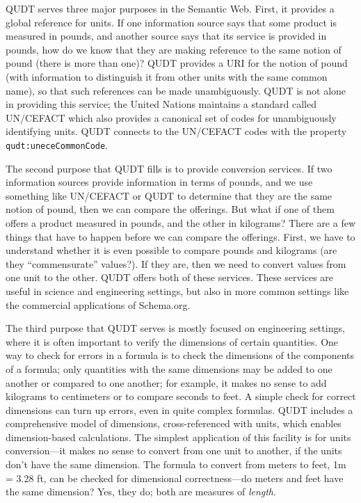 QUDT serves three major purposes in the Semantic Web. First, it provides
a global reference for units. If one information source says that some
product is measured in pounds, and another source
says that its service is provided in pounds, how do we know that they
are making reference to the same notion of pound (there is more than
one)? QUDT provides a URI for the notion of pound (with information to
distinguish it from other units with the same common name), so that such
references can be made unambiguously. QUDT is not alone in providing
this service; the United Nations maintains a standard called UN/CEFACT
which also  provides a canonical set of codes for unambiguously identifying
units. QUDT connects to the UN/CEFACT codes with the property
\texttt{qudt:uneceCommonCode}.

The second purpose that QUDT fills is to provide conversion services.
If two information sources
provide information in terms of pounds, and we use something like
UN/CEFACT or QUDT to determine that they are the same notion of pound,
then we can compare the offerings. But what if one of them offers a
product measured in pounds, and the other in kilograms? There are a few
things that have to happen before we can compare the offerings. First,
we have to understand whether it is even possible to compare pounds and
kilograms (are they ``commensurate'' values?). If they are, then we need
to convert values from one unit to the other. QUDT offers both of these
services. These services are useful in science and engineering settings,
but also in more common settings like the commercial applications of
Schema.org. 

The third purpose that QUDT serves is mostly focused on engineering
settings, where it is often important to verify the dimensions of
certain quantities. One way to check for errors in a formula is to check
the dimensions of the components of a formula; only quantities with the
same dimensions may be added to one another or compared to one another;
for example, it makes no sense to add kilograms to centimeters or to
compare seconds to feet. A simple check for correct dimensions can turn
up errors, even in quite complex formulas. QUDT includes a comprehensive
model of dimensions, cross-referenced with units, which enables
dimension-based calculations. The simplest application of this facility
is for units conversion---it makes no sense to convert from one unit to
another, if the units don't have the same dimension. The formula to
convert from meters to feet, 1m = 3.28 ft, can be checked for
dimensional correctness---do meters and feet have the same dimension?
Yes, they do; both are measures of \emph{length}.

